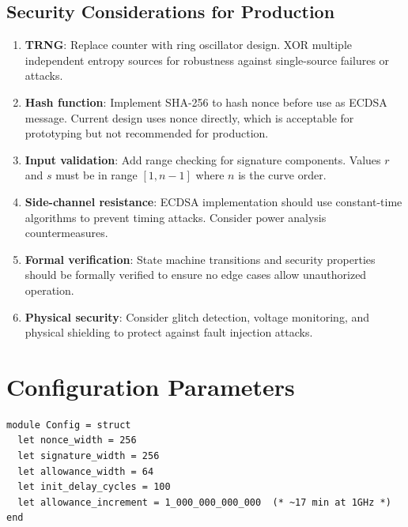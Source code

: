 \documentclass[11pt]{article}
\begin{document}
\subsection{Security Considerations for Production}

\begin{enumerate}
    \item \textbf{TRNG}: Replace counter with ring oscillator design. XOR multiple independent entropy sources for robustness against single-source failures or attacks.
    
    \item \textbf{Hash function}: Implement SHA-256 to hash nonce before use as ECDSA message. Current design uses nonce directly, which is acceptable for prototyping but not recommended for production.
    
    \item \textbf{Input validation}: Add range checking for signature components. Values $r$ and $s$ must be in range $[1, n-1]$ where $n$ is the curve order.
    
    \item \textbf{Side-channel resistance}: ECDSA implementation should use constant-time algorithms to prevent timing attacks. Consider power analysis countermeasures.
    
    \item \textbf{Formal verification}: State machine transitions and security properties should be formally verified to ensure no edge cases allow unauthorized operation.
    
    \item \textbf{Physical security}: Consider glitch detection, voltage monitoring, and physical shielding to protect against fault injection attacks.
\end{enumerate}

\section{Configuration Parameters}

\begin{lstlisting}[caption={Configuration parameters in security\_block.ml}]
module Config = struct
  let nonce_width = 256
  let signature_width = 256
  let allowance_width = 64
  let init_delay_cycles = 100
  let allowance_increment = 1_000_000_000_000  (* ~17 min at 1GHz *)
end
\end{lstlisting}
\end{document}
